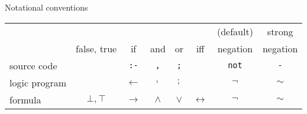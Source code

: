 \begin{frame}[c]{Notational conventions}
  \begin{center}
    \begin{tabular}{|l|ccccccc|}
      \hline
                    &             &             &            &            &                 & (default)            & strong         \\
                    & false, true & if          & and        & or         & iff             &           negation   &        negation\\
      \hline\hline
      source code   &             &\texttt{:-}  & \texttt{,} & \texttt{;} &                 & \texttt{not}         & \texttt{-}\\
      logic program &             &$\leftarrow$ & $,$        & $;$        &                 & $\neg$               & $\sim$\\
      formula       & $\bot,\top$ &$\rightarrow$& $\wedge$   & $\vee$     &$\leftrightarrow$& $\neg$               & $\sim$\\
      \hline
    \end{tabular}
  \end{center}
\end{frame}
%
